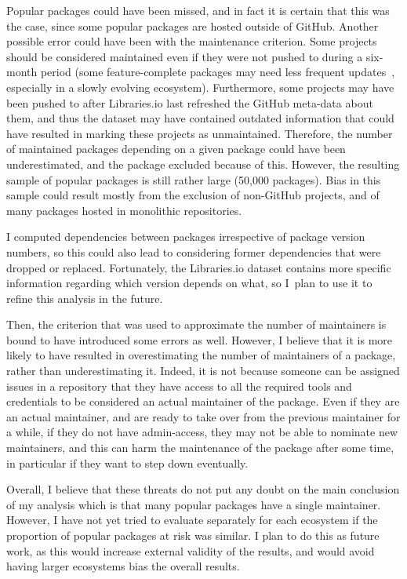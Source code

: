 Popular packages could have been missed, and in fact it is certain that this was the case, since some popular packages are hosted outside of GitHub.
Another possible error could have been with the maintenance criterion.
Some projects should be considered maintained even if they were not pushed to during a six-month period (some feature-complete packages may need less frequent updates~\cite{valiev2018ecosystem}, especially in a slowly evolving ecosystem).
Furthermore, some projects may have been pushed to after Libraries.io last refreshed the GitHub meta-data about them, and thus the dataset may have contained outdated information that could have resulted in marking these projects as unmaintained.
Therefore, the number of maintained packages depending on a given package could have been underestimated, and the package excluded because of this.
However, the resulting sample of popular packages is still rather large (50,000 packages).
Bias in this sample could result mostly from the exclusion of non-GitHub projects, and of many packages hosted in monolithic repositories.

I computed dependencies between packages irrespective of package version numbers, so this could also lead to considering former dependencies that were dropped or replaced.
Fortunately, the Libraries.io dataset contains more specific information regarding which version depends on what, so I plan to use it to refine this analysis in the future.

Then, the criterion that was used to approximate the number of maintainers is bound to have introduced some errors as well.
However, I believe that it is more likely to have resulted in overestimating the number of maintainers of a package, rather than underestimating it.
Indeed, it is not because someone can be assigned issues in a repository that they have access to all the required tools and credentials to be considered an actual maintainer of the package.
Even if they are an actual maintainer, and are ready to take over from the previous maintainer for a while, if they do not have admin-access, they may not be able to nominate new maintainers, and this can harm the maintenance of the package after some time, in particular if they want to step down eventually.

Overall, I believe that these threats do not put any doubt on the main conclusion of my analysis which is that many popular packages have a single maintainer.
However, I have not yet tried to evaluate separately for each ecosystem if the proportion of popular packages at risk was similar.
I plan to do this as future work, as this would increase external validity of the results, and would avoid having larger ecosystems bias the overall results.

